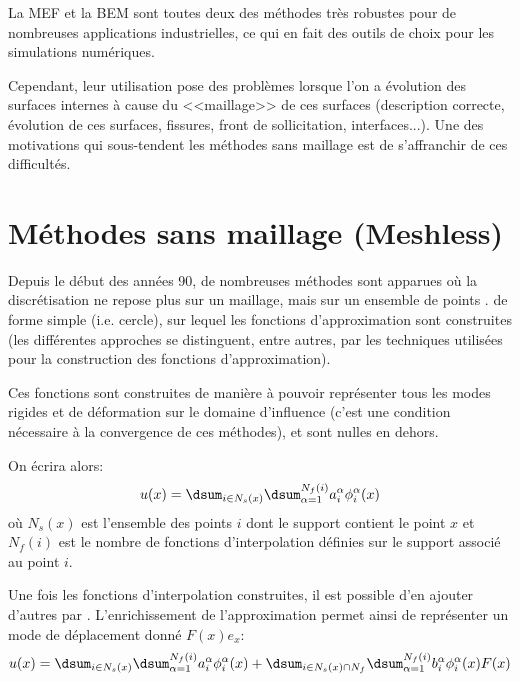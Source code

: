 \medskip
La MEF et la BEM 
sont toutes deux des méthodes très robustes pour de nombreuses 
applications industrielles, ce qui en fait des outils de choix pour les simulations numériques. 

Cependant, leur utilisation pose des problèmes lorsque l'on a  évolution des surfaces 
internes à cause du <<maillage>> de ces surfaces (description correcte, évolution de ces surfaces, fissures,
front de sollicitation, interfaces...). 
Une des motivations qui sous-tendent les méthodes sans maillage est de s'affranchir de ces difficultés.



\medskip
\section{Méthodes sans maillage (Meshless)}\label{Sec-meshless}

Depuis le début des années 90, de nombreuses méthodes sont apparues où la discrétisation ne
repose plus sur un maillage, mais sur un ensemble de points . 
 de forme simple (i.e. cercle), sur lequel les fonctions 
d'approximation sont construites (les différentes approches se distinguent, entre autres, par les 
techniques utilisées pour la construction des fonctions d'approximation). 

Ces fonctions sont construites de manière à pouvoir représenter tous les modes rigides et de 
déformation sur le domaine d'influence (c'est une condition nécessaire à la convergence de ces 
méthodes), et sont nulles en dehors.

On écrira alors:
\begin{equation}
u(x) = \dsum_{i\in N_s(x)}\dsum_{\alpha=1}^{N_f(i)} a_i^\alpha \phi_i^\alpha(x)
\end{equation}
où $N_s(x)$ est l'ensemble des points $i$ dont le support contient le point $x$ et $N_f (i)$ est le nombre 
de fonctions d'interpolation définies sur le support associé au point $i$.

\medskip
Une fois les fonctions d'interpolation construites, il est possible d'en ajouter d'autres par
. 
L'enrichissement de l'approximation permet ainsi de représenter un mode de déplacement donné
$F(x)e_x$:
\begin{equation}
u(x) = \dsum_{i\in N_s(x)}\dsum_{\alpha=1}^{N_f(i)} a_i^\alpha \phi_i^\alpha(x) +
\dsum_{i\in N_s(x)\cap N_f}\dsum_{\alpha=1}^{N_f(i)} b_i^\alpha\phi_i^\alpha(x)F(x)
\end{equation}

